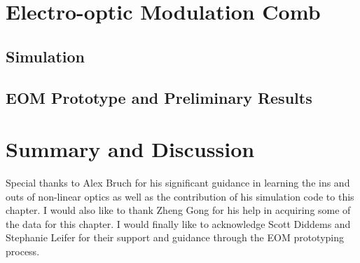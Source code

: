 \section{Electro-optic Modulation Comb}

\subsection{Simulation}

\subsection{EOM Prototype and Preliminary Results}

\section{Summary and Discussion}


Special thanks to Alex Bruch for his significant guidance in learning the ins and outs of non-linear optics as well as the contribution of his simulation code to this chapter. I would also like to thank Zheng Gong for his help in acquiring some of the data for this chapter. I would finally like to acknowledge Scott Diddems and Stephanie Leifer for their support and guidance through the EOM prototyping process.